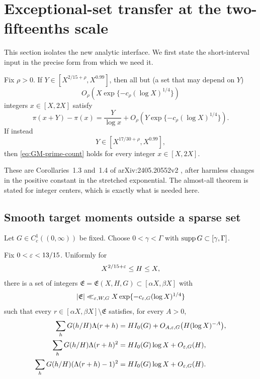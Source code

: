 \section{Exceptional-set transfer at the two-fifteenths scale}
\label{sec:exceptional-transfer}

This section isolates the new analytic interface.  We first state the
short-interval input in the precise form from which we need it.

\begin{theorem}
\label{thm:GM-input}
Fix $\rho>0$.  If
$Y\in[X^{2/15+\rho},X^{0.99}]$, then all but (a set that may depend on
$Y$)
\begin{equation}
 O_\rho\!\left(X\exp\{-c_\rho(\log X)^{1/4}\}\right)
 \label{eq:GM-exception-size}
\end{equation}
integers $x\in[X,2X]$ satisfy
\begin{equation}
 \pi(x+Y)-\pi(x)
 =\frac{Y}{\log x}
 +O_\rho\!\left(Y\exp\{-c_\rho(\log X)^{1/4}\}\right).
 \label{eq:GM-prime-count}
\end{equation}
If instead
\[
 Y\in[X^{17/30+\rho},X^{0.99}],
\]
then \eqref{eq:GM-prime-count} holds for every integer
$x\in[X,2X]$.
\end{theorem}

These are Corollaries~1.3 and~1.4 of arXiv:2405.20552v2
\citep{GuthMaynard2026}, after harmless changes in the positive constant
in the stretched exponential.  The almost-all theorem is stated for
integer centers, which is exactly what is needed here.

\subsection{Smooth target moments outside a sparse set}

Let $G\in C_c^1((0,\infty))$ be fixed.  Choose
$0<\gamma<\Gamma$ with $\operatorname{supp} G\subset[\gamma,\Gamma]$.

\begin{lemma}
\label{lem:smooth-almost-all-moments}
Fix $0<\varepsilon<13/15$.  Uniformly for
\begin{equation}
 X^{2/15+\varepsilon}\leq H\leq X,
 \label{eq:short-H-range}
\end{equation}
 there is a set of integers
 $\mathfrak E=\mathfrak E(X,H,G)\subset[\alpha X,\beta X]$ with
\begin{equation}
 |\mathfrak E|
 \ll_{\varepsilon,W,G}X
 \exp\{-c_{\varepsilon,G}(\log X)^{1/4}\}
 \label{eq:smooth-exception-size}
\end{equation}
such that every $r\in[\alpha X,\beta X]\setminus\mathfrak E$ satisfies,
for every $A>0$,
\begin{align}
 \sum_hG(h/H)\Lambda(r+h)
 &=HI_0(G)+O_{A,\varepsilon,G}\bigl(H(\log X)^{-A}\bigr),
 \label{eq:smooth-Lambda-moment}\\
 \sum_hG(h/H)\Lambda(r+h)^2
 &=HI_0(G)\log X+O_{\varepsilon,G}(H),
 \label{eq:smooth-Lambda-square-moment}\\
 \sum_hG(h/H)(\Lambda(r+h)-1)^2
 &=HI_0(G)\log X+O_{\varepsilon,G}(H).
 \label{eq:smooth-eta-square-moment}
\end{align}
\end{lemma}

